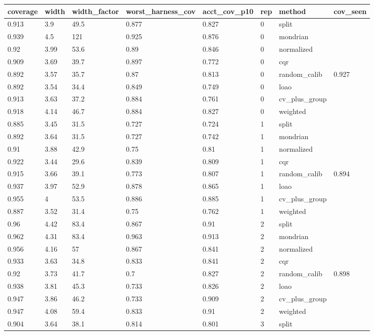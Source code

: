 \begin{tabular}{llllllll}
\toprule
coverage & width & width\_factor & worst\_harness\_cov & acct\_cov\_p10 & rep & method & cov\_seen \\
\midrule
0.913 & 3.9 & 49.5 & 0.877 & 0.827 & 0 & split &  \\
0.939 & 4.5 & 121 & 0.925 & 0.876 & 0 & mondrian &  \\
0.92 & 3.99 & 53.6 & 0.89 & 0.846 & 0 & normalized &  \\
0.909 & 3.69 & 39.7 & 0.897 & 0.772 & 0 & cqr &  \\
0.892 & 3.57 & 35.7 & 0.87 & 0.813 & 0 & random\_calib & 0.927 \\
0.892 & 3.54 & 34.4 & 0.849 & 0.749 & 0 & loao &  \\
0.913 & 3.63 & 37.2 & 0.884 & 0.761 & 0 & cv\_plus\_group &  \\
0.918 & 4.14 & 46.7 & 0.884 & 0.827 & 0 & weighted &  \\
0.885 & 3.45 & 31.5 & 0.727 & 0.724 & 1 & split &  \\
0.892 & 3.64 & 31.5 & 0.727 & 0.742 & 1 & mondrian &  \\
0.91 & 3.88 & 42.9 & 0.75 & 0.81 & 1 & normalized &  \\
0.922 & 3.44 & 29.6 & 0.839 & 0.809 & 1 & cqr &  \\
0.915 & 3.66 & 39.1 & 0.773 & 0.807 & 1 & random\_calib & 0.894 \\
0.937 & 3.97 & 52.9 & 0.878 & 0.865 & 1 & loao &  \\
0.955 & 4 & 53.5 & 0.886 & 0.885 & 1 & cv\_plus\_group &  \\
0.887 & 3.52 & 31.4 & 0.75 & 0.762 & 1 & weighted &  \\
0.96 & 4.42 & 83.4 & 0.867 & 0.91 & 2 & split &  \\
0.962 & 4.31 & 83.4 & 0.963 & 0.913 & 2 & mondrian &  \\
0.956 & 4.16 & 57 & 0.867 & 0.841 & 2 & normalized &  \\
0.933 & 3.63 & 34.8 & 0.833 & 0.841 & 2 & cqr &  \\
0.92 & 3.73 & 41.7 & 0.7 & 0.827 & 2 & random\_calib & 0.898 \\
0.938 & 3.81 & 45.3 & 0.733 & 0.826 & 2 & loao &  \\
0.947 & 3.86 & 46.2 & 0.733 & 0.909 & 2 & cv\_plus\_group &  \\
0.947 & 4.08 & 59.4 & 0.833 & 0.91 & 2 & weighted &  \\
0.904 & 3.64 & 38.1 & 0.814 & 0.801 & 3 & split &  \\

\end{tabular}
